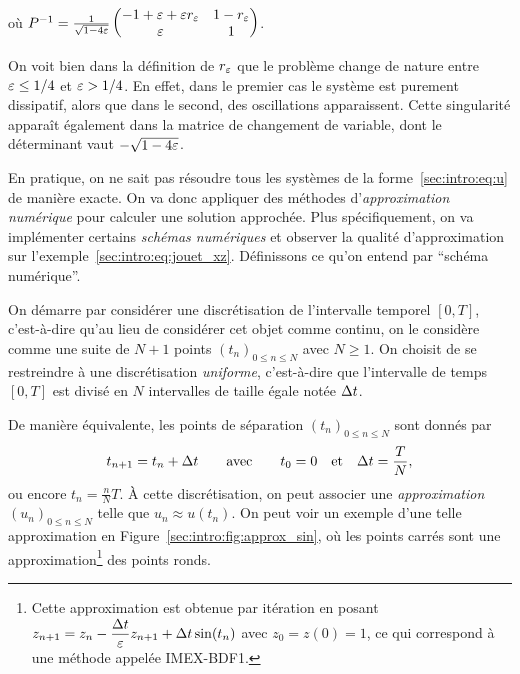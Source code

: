 où $P^{-1} = \frac{1}{\sqrt{1 - 4\varepsilon}} \begin{pmatrix}
    -1 + \varepsilon + \varepsilon r_{\varepsilon}  &  1 - r_{\varepsilon} \\
                \varepsilon         &      1
\end{pmatrix}$.
\begin{FRremark*}
    On voit bien dans la définition de $r_{\varepsilon}$ que le problème change de nature entre $\varepsilon \leq 1/4$ et $\varepsilon > 1/4$. En effet, dans le premier cas le système est purement dissipatif, alors que dans le second, des oscillations apparaissent. Cette singularité apparaît également dans la matrice de changement de variable, dont le déterminant vaut $-\sqrt{1 - 4\varepsilon}$.
\end{FRremark*}


En pratique, on ne sait pas résoudre tous les systèmes de la forme~\eqref{sec:intro:eq:u} de manière exacte. On va donc appliquer des méthodes d'\textit{approximation numérique} pour calculer une solution approchée. Plus spécifiquement, on va implémenter certains \textit{schémas numériques} et observer la qualité d'approximation sur l'exemple~\eqref{sec:intro:eq:jouet_xz}. Définissons ce qu'on entend par \enquote{schéma numérique}. 

On démarre par considérer une discrétisation de l'intervalle temporel $[0,T]$, c'est-à-dire qu'au lieu de considérer cet objet comme continu, on le considère comme une suite de $N+1$ points $(t_n)_{0 \leq n \leq N}$ avec $N \geq 1$. On choisit de se restreindre à une discrétisation \textit{uniforme}, c'est-à-dire que l'intervalle de temps $[0,T]$ est divisé en $N$ intervalles de taille égale notée $\Delta t$. 
\begin{center}\end{center}
\vspace*{-12pt}
%
\noindent%
De manière équivalente, les points de séparation $(t_n)_{0 \leq n \leq N}$ sont donnés par 
\begin{equation*}
    t_{n+1} = t_n + \Delta t
    \qquad\text{avec}\qquad
    t_0 = 0 \quad\text{et}\quad \Delta t = \frac{T}{N} ,
\end{equation*}
ou encore $t_n = \frac{n}{N}T$. À cette discrétisation, on peut associer une \textit{approximation} $(u_n)_{0 \leq n \leq N}$ telle que $u_n \approx u(t_n)$. On peut voir un exemple d'une telle approximation en Figure~\ref{sec:intro:fig:approx_sin}, où les points carrés sont une approximation\footnote{Cette approximation est obtenue par itération en posant $\displaystyle z_{n+1} = z_n - \frac{\Delta t}{\varepsilon}z_{n+1} + \Delta t \sin(t_n)$ avec $z_0 = z(0) = 1$, ce qui correspond à une méthode appelée IMEX-BDF1.} des points ronds. 

